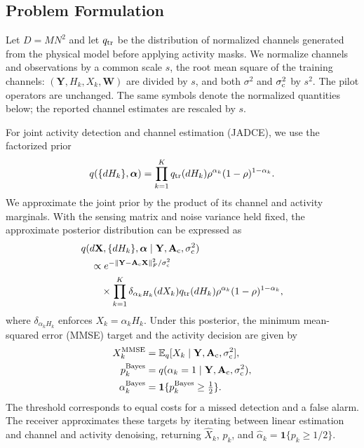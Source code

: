 \subsection{Problem Formulation}

Let $D=MN^2$ and let $q_{\rm tr}$ be the distribution of normalized channels
generated from the physical model before applying activity masks.
We normalize channels and observations by a common scale $s$,
the root mean square of the training channels:
$(\mathbf Y,H_k,X_k,\mathbf W)$ are divided by $s$, and both
$\sigma^2$ and $\sigma_{\rm c}^2$ by $s^2$. The pilot operators are
unchanged. The same symbols denote the normalized quantities below;
the reported channel estimates are rescaled by $s$.

For joint activity detection and channel estimation (JADCE), we use
the factorized prior
\begin{equation}
 q(\{dH_k\},\bm\alpha)=
 \prod_{k=1}^{K}q_{\rm tr}(dH_k)
 \rho^{\alpha_k}(1-\rho)^{1-\alpha_k}.
 \label{eq:working-prior}
\end{equation}
We approximate the joint prior by the product of its channel
and activity marginals. With the sensing matrix and noise variance
held fixed, the approximate posterior distribution can be expressed as
\begin{equation}
 \begin{aligned}
 &q(d\mathbf X,\{dH_k\},\bm\alpha\mid
 \mathbf Y,\mathbf A_{\rm c},\sigma_{\rm c}^2)\\
 &\quad\propto
 e^{-\left\lVert\mathbf Y-\mathbf A_{\rm c}\mathbf X\right\rVert_F^2/\sigma_{\rm c}^2}\\
 &\qquad\times\prod_{k=1}^{K}
 \delta_{\alpha_kH_k}(dX_k)q_{\rm tr}(dH_k)
 \rho^{\alpha_k}(1-\rho)^{1-\alpha_k},
 \end{aligned}
 \label{eq:working-posterior}
\end{equation}
where $\delta_{\alpha_kH_k}$ enforces $X_k=\alpha_kH_k$.
Under this posterior, the minimum mean-squared error (MMSE) target
and the activity decision are given by
\begin{equation}
 \begin{aligned}
 X_k^{\rm MMSE}&=\mathbb{E}_q[X_k\mid\mathbf Y,\mathbf A_{\rm c},\sigma_{\rm c}^2],\\
 p_k^{\rm Bayes}&=q(\alpha_k=1\mid\mathbf Y,\mathbf A_{\rm c},\sigma_{\rm c}^2),\\
 \alpha_k^{\rm Bayes}&=\mathbf1\{p_k^{\rm Bayes}\geq\tfrac12\}.
 \end{aligned}
 \label{eq:targets}
\end{equation}
The threshold corresponds to equal costs for a missed detection and a
false alarm. The receiver approximates these targets by iterating between
linear estimation and channel and activity denoising, returning
$\widehat X_k$, $p_k$, and $\widehat\alpha_k=\mathbf1\{p_k\geq1/2\}$.

